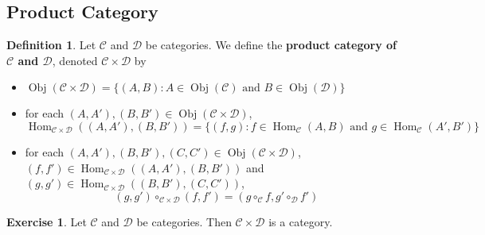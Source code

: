 \documentclass{book}
\theoremstyle{definition}
\newtheorem{defn}[definition]{Definition}
\newtheorem{ex}[definition]{Exercise}
\newcommand{\MC}{\mathcal{C}}
\newcommand{\MD}{\mathcal{D}}
\DeclareMathOperator{\Obj}{Obj}
\DeclareMathOperator{\Hom}{Hom}
\DeclareMathOperator*{\0}{\mbf{0}}
\DeclareMathOperator*{\1}{\mbf{1}}
\begin{document}
	
	\subsection{Product Category}
	
	\begin{defn}
		Let $\MC$ and $\MD$ be categories. We define the \textbf{product category of $\MC$ and $\MD$}, denoted $\MC \times \MD$ by 
		\begin{itemize}
			\item $\Obj(\MC \times \MD) = \{(A, B): A \in \Obj(\MC) \text{ and } B \in \Obj(\MD)\}$
			\item for each $(A, A'), (B, B') \in \Obj(\MC \times \MD)$, $\Hom_{\MC \times \MD}((A, A'), (B, B')) = \{(f,g): f \in \Hom_{\MC}(A, B) \text{ and }  g \in \Hom_{\MC}(A', B') \}$
			\item for each  $(A, A'), (B, B'), (C, C') \in \Obj(\MC \times \MD)$, $(f, f') \in \Hom_{\MC \times \MD}((A, A'), (B, B'))$ and $(g, g') \in \Hom_{\MC \times \MD}((B, B'), (C, C'))$, 
			$$(g,g') \circ_{\MC \times \MD} (f, f') = (g \circ_{\MC} f, g' \circ_{\MD} f')$$
		\end{itemize}
	\end{defn}
	
	\begin{ex}
		Let $\MC$ and $\MD$ be categories. Then $\MC \times \MD$ is a category. 
	\end{ex}
	
\end{document}
